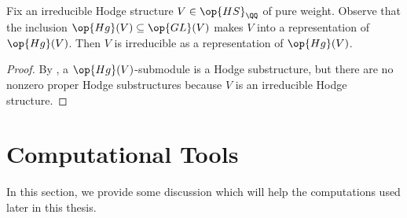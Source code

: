 \documentclass[../thesis.tex]{subfiles}
\begin{document}
\begin{corollary} \label{cor:irrep-hs-is-irrep-hg}
	Fix an irreducible Hodge structure $V\in\op{HS}_\QQ$ of pure weight. Observe that the inclusion $\op{Hg}(V)\subseteq\op{GL}(V)$ makes $V$ into a representation of $\op{Hg}(V)$. Then $V$ is irreducible as a representation of $\op{Hg}(V)$.
\end{corollary}
\begin{proof}
	By , a $\op{Hg}(V)$-submodule is a Hodge substructure, but there are no nonzero proper Hodge substructures because $V$ is an irreducible Hodge structure.
\end{proof}

\section{Computational Tools}
In this section, we provide some discussion which will help the computations used later in this thesis.
\end{document}
